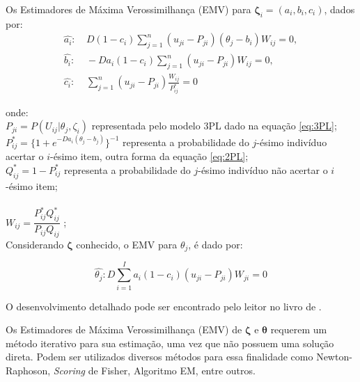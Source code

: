 Os Estimadores de Máxima Verossimilhança (EMV) para $ \boldsymbol{\zeta}_i = (a_i, b_i , c_i )$, dados por:\\


\[
\begin{aligned}
	\hat{a_i}: & \ D(1 - c_i)\sum_{j=1}^{n}(u_{ji} - P_{ji})(\theta_j - b_i)W_{ij} = 0, \\[1em]
	\hat{b_i}: & \ -Da_i(1 - c_i)\sum_{j=1}^{n}(u_{ji} - P_{ji})W_{ij} = 0, \\[1em]
	\hat{c_i}: & \ \sum_{j=1}^{n}(u_{ji} - P_{ji})\frac{W_{ij}}{P^*_{ij}} = 0
\end{aligned}
\]

\noindent onde:\\

\noindent $P_{ji} = P(U_{ij}|\theta_j,\zeta_i)$ representada pelo modelo 3PL dado na equação \ref{eq:3PL};\\

\noindent $P^*_{ij} = \{1 + e^{-Da_i(\theta_j - b_j)}\}^{-1} $ representa a probabilidade do $j$-ésimo indivíduo acertar o $i$-ésimo item, outra forma da equação \ref{eq:2PL};\\

\noindent $Q^*_{ij} = 1 - P^*_{ij} $ representa a probabilidade do $j$-ésimo indivíduo não acertar o $i$-ésimo item;\\
\\
\noindent $W_{ij} = \dfrac{P^*_{ij}Q^*_{ij}}{P_{ij}Q_{ij}} $ ;\\




Considerando $\boldsymbol{\zeta}$ conhecido, o EMV para $ \theta_j $,  é dado por:


\[ \hat{\theta_j} : D\sum_{i=1}^{I}{a_i(1-c_i)(u_{ji}-P_{ji})W_{ji}} = 0  \] 

O desenvolvimento detalhado pode ser encontrado pelo leitor no livro de .

Os Estimadores de Máxima Verossimilhança (EMV) de $ \boldsymbol{\zeta} $ e $ \boldsymbol{\theta} $ requerem um método iterativo para sua estimação, uma vez que não possuem uma solução direta. Podem ser utilizados diversos métodos para essa finalidade como Newton-Raphoson, \textit{Scoring} de Fisher, Algoritmo EM, entre outros.

